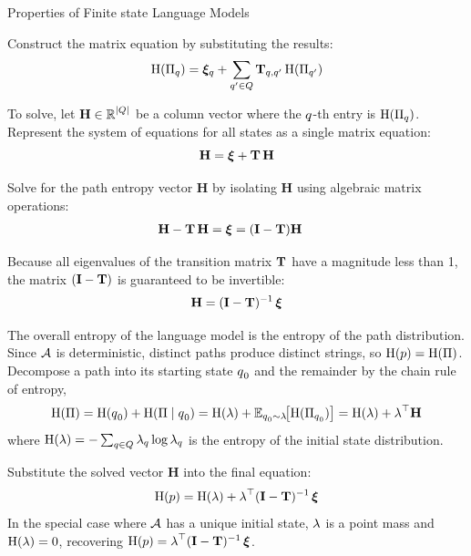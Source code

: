 \begin{question}{Properties of Finite state Language Models}
\begin{subquestion}
Construct the matrix equation by substituting the results:
\begin{equation}
    \ent(\Pi_\stateq) = \boldsymbol{\xi}_\stateq + \sum_{\stateq' \in \states} \transMtx_{\stateq, \stateq'}\, \ent(\Pi_{\stateq'})
\end{equation}

To solve, let $\mathbf{H} \in \R^{|\states|}$ be a column vector where the $\stateq$-th entry is $\ent(\Pi_\stateq)$. 
Represent the system of equations for all states as a single matrix equation:
\begin{equation}
    \mathbf{H} = \boldsymbol{\xi} + \transMtx\,\mathbf{H}
\end{equation}

Solve for the path entropy vector $\mathbf{H}$ by isolating $\mathbf{H}$ using algebraic matrix operations:
\begin{align}
    \mathbf{H} - \transMtx\,\mathbf{H} &= \boldsymbol{\xi} = (\mathbf{I} - \transMtx)\mathbf{H}
\end{align}

Because all eigenvalues of the transition matrix $\transMtx$ have a magnitude less than 1, the matrix $(\mathbf{I} - \transMtx)$ is guaranteed to be invertible:
\begin{equation}
    \mathbf{H} = (\mathbf{I} - \transMtx)^{-1}\,\boldsymbol{\xi}
\end{equation}

The overall entropy of the language model is the entropy of the path distribution. 
Since $\automaton$ is deterministic, distinct paths produce distinct strings, so $\ent(\pLM) = \ent(\Pi)$. 
Decompose a path into its starting state $\stateq_0$ and the remainder by the chain rule of entropy,
\begin{equation}
    \ent(\Pi) = \ent(\stateq_0) + \ent(\Pi \mid \stateq_0) = \ent(\initf) + \expectation_{\stateq_0 \sim \initf}\!\big[\ent(\Pi_{\stateq_0})\big] = \ent(\initf) + \initf^\top \mathbf{H}
\end{equation}
where $\ent(\initf) = -\sum_{\stateq \in \states} \initf_\stateq \log \initf_\stateq$ is the entropy of the initial state distribution.

Substitute the solved vector $\mathbf{H}$ into the final equation:
\begin{equation}
    \ent(\pLM) = \ent(\initf) + \initf^\top (\mathbf{I} - \transMtx)^{-1}\,\boldsymbol{\xi}
\end{equation}
In the special case where $\automaton$ has a unique initial state, $\initf$ is a point mass and $\ent(\initf) = 0$, recovering $\ent(\pLM) = \initf^\top (\mathbf{I} - \transMtx)^{-1}\,\boldsymbol{\xi}$.
\end{subquestion}

\end{question}